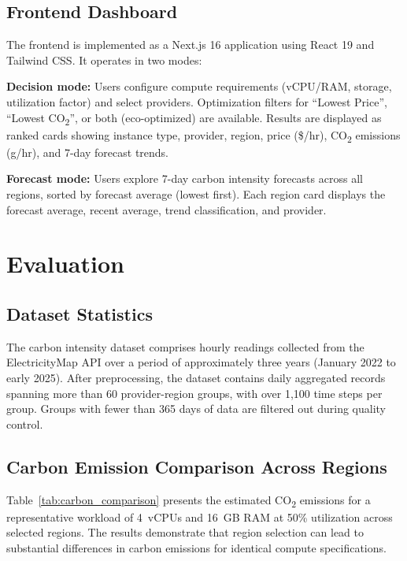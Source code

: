 \documentclass[12pt]{article}
\begin{document}
\subsection{Frontend Dashboard}

The frontend is implemented as a Next.js 16 application using React 19 and Tailwind CSS. It operates in two modes:

\textbf{Decision mode:} Users configure compute requirements (vCPU/RAM, storage, utilization factor) and select providers. Optimization filters for ``Lowest Price'', ``Lowest CO\textsubscript{2}'', or both (eco-optimized) are available. Results are displayed as ranked cards showing instance type, provider, region, price (\$/hr), CO\textsubscript{2} emissions (g/hr), and 7-day forecast trends.

\textbf{Forecast mode:} Users explore 7-day carbon intensity forecasts across all regions, sorted by forecast average (lowest first). Each region card displays the forecast average, recent average, trend classification, and provider.

\section{Evaluation}

\subsection{Dataset Statistics}

The carbon intensity dataset comprises hourly readings collected from the ElectricityMap API over a period of approximately three years (January 2022 to early 2025). After preprocessing, the dataset contains daily aggregated records spanning more than 60 provider-region groups, with over 1,100 time steps per group. Groups with fewer than 365 days of data are filtered out during quality control.

\subsection{Carbon Emission Comparison Across Regions}

Table~\ref{tab:carbon_comparison} presents the estimated CO\textsubscript{2} emissions for a representative workload of 4~vCPUs and 16~GB RAM at 50\% utilization across selected regions. The results demonstrate that region selection can lead to substantial differences in carbon emissions for identical compute specifications.
\end{document}
